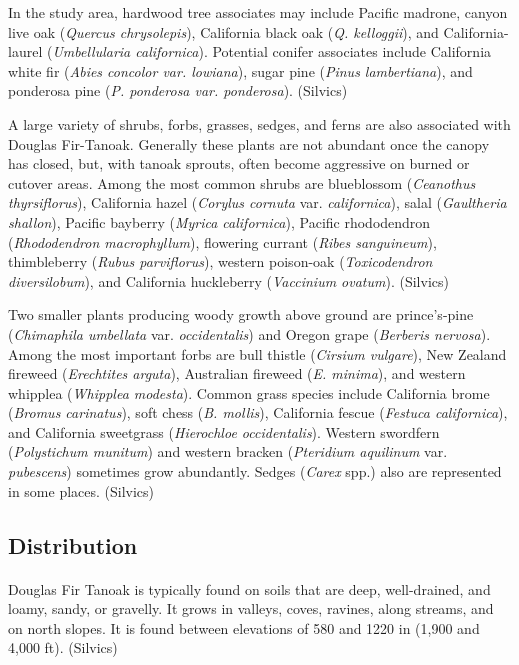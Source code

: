 \documentclass{article}
\begin{document}
In the study area, hardwood tree associates may include Pacific madrone, canyon live oak (\emph{Quercus chrysolepis}), California black oak (\emph{Q. kelloggii}), and California-laurel (\emph{Umbellularia californica}). Potential conifer associates include California white fir (\emph{Abies concolor var. lowiana}), sugar pine (\emph{Pinus lambertiana}), and ponderosa pine (\emph{P. ponderosa var. ponderosa}). (Silvics)

A large variety of shrubs, forbs, grasses, sedges, and ferns are also associated with Douglas Fir-Tanoak. Generally these plants are not abundant once the canopy has closed, but, with tanoak sprouts, often become aggressive on burned or cutover areas. Among the most common shrubs are blueblossom (\emph{Ceanothus thyrsiflorus}), California hazel (\emph{Corylus cornuta} var. \emph{californica}), salal (\emph{Gaultheria shallon}), Pacific bayberry (\emph{Myrica californica}), Pacific rhododendron (\emph{Rhododendron macrophyllum}), flowering currant (\emph{Ribes sanguineum}), thimbleberry (\emph{Rubus parviflorus}), western poison-oak (\emph{Toxicodendron diversilobum}), and California huckleberry (\emph{Vaccinium ovatum}). (Silvics)

Two smaller plants producing woody growth above ground are prince's-pine (\emph{Chimaphila umbellata} var. \emph{occidentalis}) and Oregon grape (\emph{Berberis nervosa}). Among the most important forbs are bull thistle (\emph{Cirsium vulgare}), New Zealand fireweed (\emph{Erechtites arguta}), Australian fireweed (\emph{E. minima}), and western whipplea (\emph{Whipplea modesta}). Common grass species include California brome (\emph{Bromus carinatus}), soft chess (\emph{B. mollis}), California fescue (\emph{Festuca californica}), and California sweetgrass (\emph{Hierochloe occidentalis}). Western swordfern (\emph{Polystichum munitum}) and western bracken (\emph{Pteridium aquilinum} var. \emph{pubescens}) sometimes grow abundantly. Sedges (\emph{Carex} spp.) also are represented in some places. (Silvics)

\subsection*{Distribution}

\paragraph{} Douglas Fir Tanoak is typically found on soils that are deep, well-drained, and loamy, sandy, or gravelly. It grows in valleys, coves, ravines, along streams, and on north slopes. It is found between elevations of 580 and 1220 in (1,900 and 4,000 ft). (Silvics)
\end{document}

